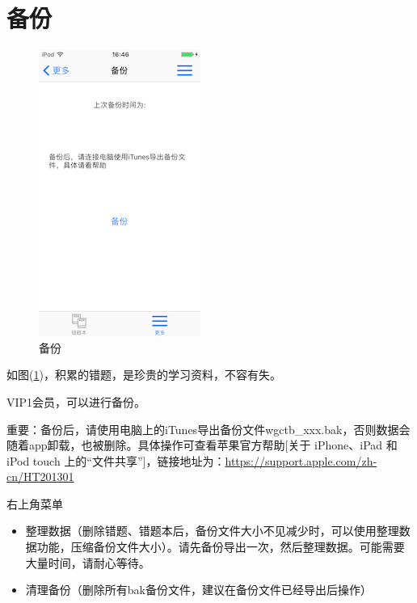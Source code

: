 \section{备份}
\begin{figure}[H]
	\centering
	\includegraphics{img/31.png}
	\caption{备份}
	\label{img31}
\end{figure}
如图(\ref{img31})，积累的错题，是珍贵的学习资料，不容有失。

VIP1会员，可以进行备份。

重要：备份后，请使用电脑上的iTunes导出备份文件wgctb\_xxx.bak，否则数据会随着app卸载，也被删除。具体操作可查看苹果官方帮助[关于 iPhone、iPad 和 iPod touch 上的“文件共享”]，链接地址为：\url{https://support.apple.com/zh-cn/HT201301}

右上角菜单
\begin{itemize}
	\item 整理数据（删除错题、错题本后，备份文件大小不见减少时，可以使用整理数据功能，压缩备份文件大小）。请先备份导出一次，然后整理数据。可能需要大量时间，请耐心等待。
	\item 清理备份（删除所有bak备份文件，建议在备份文件已经导出后操作）
\end{itemize}

